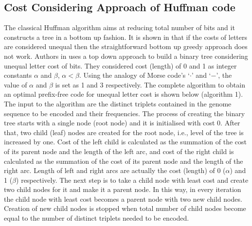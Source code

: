 \documentclass[preprint,12pt]{elsarticle}%
\begin{document}
\subsection{Cost Considering Approach of Huffman code}
The classical Huffman algorithm aims at reducing total number of bits and it constructs a tree in a bottom up fashion. It is shown in \cite{golin98} that if the costs of letters are considered unequal then the straightforward bottom up greedy approach does not work. Authors in \cite{Kab14} uses a top down approach to build a binary tree considering unequal letter cost of bits. They considered cost (length) of 0 and 1 as integer constants $\alpha$ and $\beta$,   $\alpha < \beta$. Using the analogy of Morse code's `$\cdot$' and `$-$', the value of $\alpha$ and $\beta$ is set as 1 and 3 respectively. The complete algorithm to obtain an optimal prefix-free code for unequal letter cost is shown below (algorithm 1). The input to the algorithm are the distinct triplets contained in the genome sequence to be encoded and their frequencies. The process of creating the binary tree starts with a single node (root node) and it is initialised with cost 0.  After that, two child (leaf) nodes are created for the root node, i.e., level of the tree is increased by one. Cost of the left child is calculated as the summation of the cost of its parent node and the length of the left arc, and cost of the right child is calculated as the summation of the cost of its parent node and the length of the right arc. Length of left and right arcs are actually the cost (length) of 0 ($\alpha$) and 1 ($\beta$) respectively. The next step is to take a child node with least cost and create two child nodes for it and make it a parent node. In this way, in every iteration the child node with least cost becomes a parent node with two new child nodes. Creation of new child nodes is stopped when total number of child nodes become equal to the number of distinct triplets needed to be encoded. 
\end{document}
